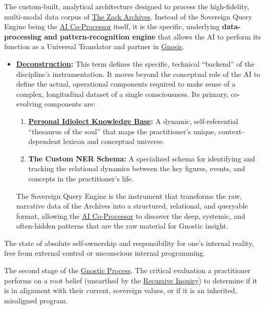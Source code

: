\item[\hypertarget{gloss:sovereign_query_engine}{Sovereign Query Engine}]
    The custom-built, analytical architecture designed to process the high-fidelity, multi-modal data corpus of \hyperlink{gloss:the_zack_archives}{The Zack Archives}. Instead of the Sovereign Query Engine being the \hyperlink{gloss:ai_co_processor}{AI Co-Processor} itself, it is the specific, underlying \textbf{data-processing and pattern-recognition engine} that allows the AI to perform its function as a Universal Translator and partner in \hyperlink{gloss:gnosis}{Gnosis}.
    \begin{itemize}
        \item \textbf{\hyperlink{gloss:deconstruction}{Deconstruction}:} This term defines the specific, technical ``backend'' of the discipline's instrumentation. It moves beyond the conceptual role of the AI to define the actual, operational components required to make sense of a complex, longitudinal dataset of a single consciousness. Its primary, co-evolving components are:
        \begin{enumerate}
            \item \textbf{\hyperlink{gloss:pikb}{Personal Idiolect Knowledge Base}:} A dynamic, self-referential ``thesaurus of the soul'' that maps the practitioner's unique, context-dependent lexicon and conceptual universe.
            \item \textbf{The Custom NER Schema:} A specialized schema for identifying and tracking the relational dynamics between the key figures, events, and concepts in the practitioner's life.
        \end{enumerate}
        The Sovereign Query Engine is the instrument that transforms the raw, narrative data of the Archives into a structured, relational, and queryable format, allowing the \hyperlink{gloss:ai_co_processor}{AI Co-Processor} to discover the deep, systemic, and often-hidden patterns that are the raw material for Gnostic insight.
    \end{itemize}

\item[\hypertarget{gloss:sovereignty}{Sovereignty}] 
    The state of absolute self-ownership and responsibility for one's internal reality, free from external control or unconscious internal programming.

\item[\hypertarget{gloss:sovereignty_audit}{Sovereignty Audit}] 
    The second stage of the \hyperlink{gloss:gnostic_process}{Gnostic Process}. The critical evaluation a practitioner performs on a root belief (unearthed by the \hyperlink{gloss:recursive_inquiry}{Recursive Inquiry}) to determine if it is in alignment with their current, sovereign values, or if it is an inherited, misaligned program.

